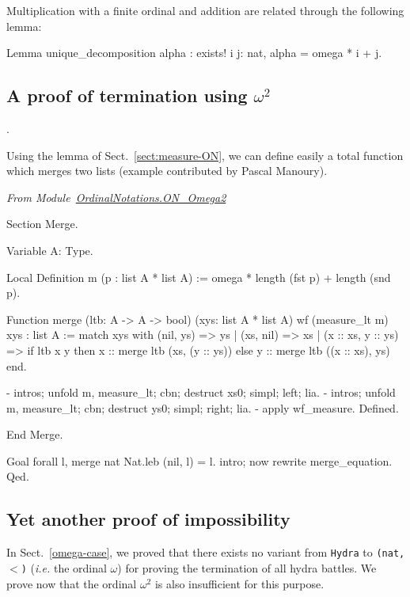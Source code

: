 Multiplication with a finite ordinal and addition are related through the following lemma:

\begin{Coqsrc}
Lemma unique_decomposition alpha : 
    exists! i j: nat,  alpha = omega * i + j.
\end{Coqsrc}

\subsection{A proof of termination using \texorpdfstring{$\omega^2$}{omega^2}} 
\label{sect:merge-example}.

Using the lemma of Sect.~\vref{sect:measure-ON}, we can define easily a total function which merges two lists (example contributed by Pascal Manoury).


\vspace{4pt}
\noindent\emph{From Module~\href{../theories/html/hydras.OrdinalNotations.ON_Omega2.html}{OrdinalNotations.ON\_Omega2}}

\begin{Coqsrc}
Section Merge.

  Variable A: Type.

  Local Definition m (p : list A * list A) :=
    omega * length (fst p) + length (snd p).

  Function  merge  (ltb: A -> A -> bool)
          (xys: list A * list A)
          {wf (measure_lt m) xys} :
    list A :=
    match xys with
      (nil, ys) => ys
    | (xs, nil) => xs
    | (x :: xs, y :: ys) =>
      if ltb x y then x :: merge  ltb (xs, (y :: ys))
      else y :: merge  ltb ((x :: xs), ys)
    end.

  - intros; unfold m, measure_lt; cbn; destruct xs0; simpl; left; lia.
  - intros; unfold m, measure_lt; cbn; destruct ys0; simpl; right; lia.
  - apply wf_measure.
  Defined.

End Merge.

Goal forall l, merge nat Nat.leb (nil, l) = l.
  intro; now rewrite merge_equation.
Qed.
\end{Coqsrc}
 

\subsection{Yet another  proof of impossibility}
\label{omega2-case}

In Sect.~\vref{omega-case}, we proved that there exists no variant from \texttt{Hydra} to \texttt{(nat,$<$)}
(\emph{i.e.} the ordinal $\omega$) for proving the termination of all hydra battles.
We  prove now that  the ordinal $\omega^2$ is also insufficient for this purpose. 

